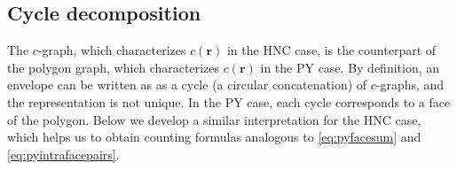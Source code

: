 \documentclass[aip,jcp,reprint,superscriptaddress]{revtex4-1}
\newcommand{\vct}[1]{\mathbf{#1}}
\providecommand{\vr}{} %
\renewcommand{\vr}{\vct{r}}
\begin{document}
\subsection*{Cycle decomposition}



The $c$-graph, which characterizes $c(\vr)$ in the HNC case,
  is the counterpart of the polygon graph,
  which characterizes $c(\vr)$ in the PY case.
%
By definition, an envelope can be written as
  as a cycle (a circular concatenation) of $c$-graphs,
  and the representation is not unique.
%
In the PY case, each cycle corresponds to a face of the polygon.
%
Below we develop a similar interpretation for the HNC case,
  which helps us to obtain counting formulas analogous to
  \eqref{eq:pyfacesum} and \eqref{eq:pyintrafacepairs}.
\end{document}
